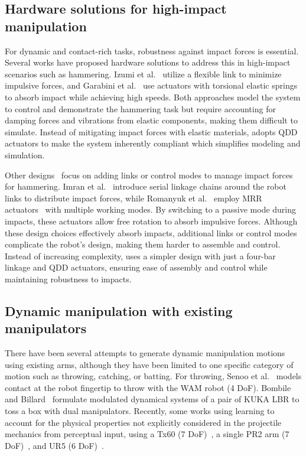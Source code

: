 \subsection{Hardware solutions for high-impact manipulation}

For dynamic and contact-rich tasks, robustness against impact forces is essential. Several works have proposed hardware solutions to address this in high-impact scenarios such as hammering. Izumi et al.~\cite{izumi1993control} utilize a flexible link to minimize impulsive forces, and Garabini et al.~\cite{garabini2011optimality} use actuators with torsional elastic springs to absorb impact while achieving high speeds. 
Both approaches model the system to control and demonstrate the hammering task but require accounting for damping forces and vibrations from elastic components, making them difficult to simulate.
Instead of mitigating impact forces with elastic materials, \robot adopts QDD actuators to make the system inherently compliant which simplifies modeling and simulation.

Other designs~\cite{imran2016impulse, romanyuk2019multiple} focus on adding links or control modes to manage impact forces for hammering. Imran et al.~\cite{imran2016impulse} introduce serial linkage chains around the robot links to distribute impact forces, while Romanyuk et al.~\cite{romanyuk2019multiple} employ MRR actuators~\cite{liu2008development} with multiple working modes. By switching to a passive mode during impacts, these actuators allow free rotation to absorb impulsive forces. Although these design choices effectively absorb impacts, additional links or control modes complicate the robot’s design, making them harder to assemble and control. Instead of increasing complexity, \robot uses a simpler design with just a four-bar linkage and QDD actuators, ensuring ease of assembly and control while maintaining robustness to impacts.

\subsection{Dynamic manipulation with existing manipulators}
There have been several attempts to generate dynamic manipulation motions using existing arms, although they have been limited to one specific category of motion such as throwing, catching, or batting. For throwing, Senoo et al.~\cite{high_speed_throwing} models contact at the robot fingertip to throw with the WAM robot (4 DoF). Bombile and Billard~\cite{kuka_grabbing_tossing} formulate modulated dynamical systems of a pair of KUKA LBR to toss a box with dual manipulators. Recently, some works using learning to account for the physical properties not explicitly considered in the projectile mechanics from perceptual input, using a Tx60 (7 DoF)~\cite{throwing_visual_feedback}, a single PR2 arm (7 DoF)~\cite{dppt}, and UR5 (6 DoF)~\cite{zeng2020tossingbot}. 

